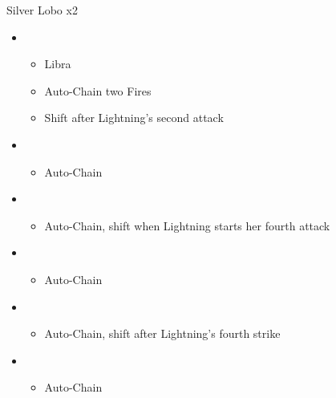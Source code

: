	\begin{battle}[0:34]{Silver Lobo x2}
		\begin{itemize}
			\item \first
			      \begin{itemize}
				      \item Libra
				      \item Auto-Chain two Fires
				      \item Shift after Lightning's second attack
			      \end{itemize}
			\item \fourth
			      \begin{itemize}
				      \item Auto-Chain
			      \end{itemize}
			\item \sixth
			      \begin{itemize}
				      \item Auto-Chain, shift when Lightning starts her fourth attack
			      \end{itemize}
			\item \first
			      \begin{itemize}
				      \item Auto-Chain
			      \end{itemize}
			\item \fourth
			      \begin{itemize}
				      \item Auto-Chain, shift after Lightning's fourth strike
			      \end{itemize}
			\item \sixth
			      \begin{itemize}
				      \item Auto-Chain
			      \end{itemize}
		\end{itemize}
	\end{battle}
	\vfill

